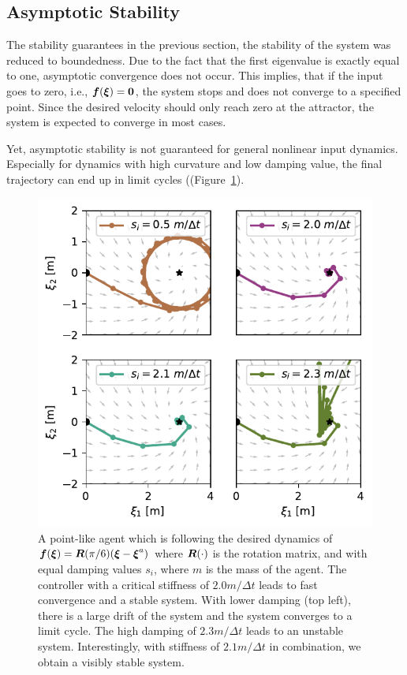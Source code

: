 \subsection{Asymptotic Stability}
The stability guarantees in the previous section, the stability of the system was reduced to boundedness. 
Due to the fact that the first eigenvalue is exactly equal to one, asymptotic convergence does not occur. 
This implies, that if the input goes to zero, i.e., $\boldsymbol{f}(\boldsymbol{\xi}) = \boldsymbol{0}$, the system stops and does not converge to a specified point. Since the desired velocity should only reach zero at the attractor, the system is expected to converge in most cases.

Yet, asymptotic stability is not guaranteed for general nonlinear input dynamics. Especially for dynamics with high curvature and low damping value, the final trajectory can end up in limit cycles ((Figure~\ref{fig:discrete_controller_parameters_comparison_stable}).

\begin{figure}[htb]
\centering
  \includegraphics[width=\columnwidth]{figures/discrete_controller_parameters_comparison_stable}
\caption{A point-like agent which is following the desired dynamics of
$\boldsymbol{f}(\boldsymbol{\xi}) = \boldsymbol{R}(\pi / 6) (\boldsymbol{\xi}  - \boldsymbol{\xi}^a)$ where $\boldsymbol{R}(\cdot)$ is the rotation matrix, and with equal damping values $s_i$, where $m$ is the mass of the agent.
The controller with a critical stiffness of $2.0 m / \Delta t$ leads to fast convergence and a stable system. With lower damping (top left), there is a large drift of the system and the system converges to a limit cycle. 
The high damping of $2.3 m / \Delta t$ leads to an unstable system. 
Interestingly, with stiffness of $2.1 m / \Delta t$ in combination, we obtain a visibly stable system.}
  \label{fig:discrete_controller_parameters_comparison_stable}
\end{figure}

